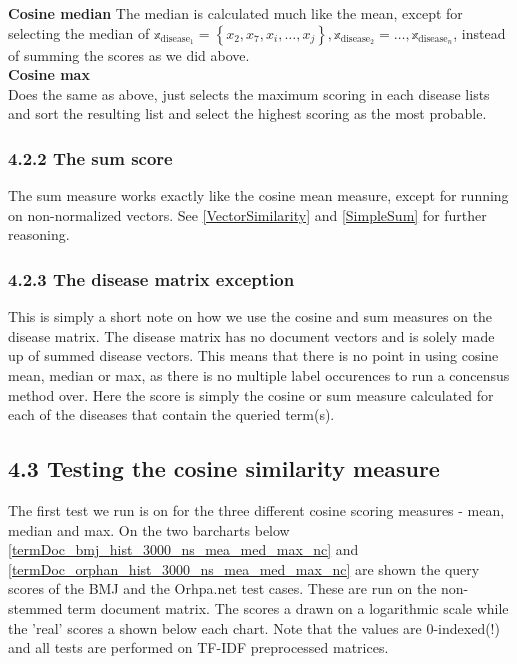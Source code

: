 \textbf{Cosine median}
The median is calculated much like the mean, except for selecting the median of $\mathbb{x}_{\textrm{disease}_{1}} = \left\{x_2,x_7, x_i, \dots, x_j\right\}, \mathbb{x}_{\textrm{disease}_{2}} = \dots, \mathbb{x}_{\textrm{disease}_{n}}$, instead of summing the scores as we did above. \\

\textbf{Cosine max} \\
Does the same as above, just selects the maximum scoring in each disease lists and sort the resulting list and select the highest scoring as the most probable. \\

\subsubsection{4.2.2 The sum score}

The sum measure works exactly like the cosine mean measure, except for running on non-normalized vectors. See \ref{VectorSimilarity} and \ref{SimpleSum} for further reasoning. \\

\subsubsection{4.2.3 The disease matrix exception}

This is simply a short note on how we use the cosine and sum measures on the disease matrix. The disease matrix has no document vectors and is solely made up of summed disease vectors. This means that there is no point in using cosine mean, median or max, as there is no multiple label occurences to run a concensus method over. Here the score is simply the cosine or sum measure calculated for each of the diseases that contain the queried term(s). \\

\subsection{4.3 Testing the cosine similarity measure\label{TestingCosineSimilarity}}

The first test we run is on for the three different cosine scoring measures - mean, median and max. On the two barcharts below \ref{termDoc_bmj_hist_3000_ns_mea_med_max_nc} and \ref{termDoc_orphan_hist_3000_ns_mea_med_max_nc} are shown the query scores of the BMJ and the Orhpa.net test cases. These are run on the non-stemmed term document matrix. The scores a drawn on a logarithmic scale while the 'real' scores a shown below each chart. Note that the values are 0-indexed(!) and all tests are performed on TF-IDF preprocessed matrices. \\


